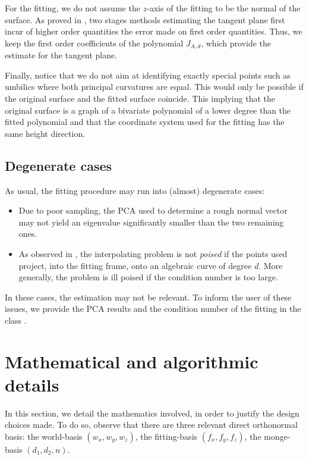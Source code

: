 For the fitting, we do not assume the $z$-axis of the fitting to be
the normal of the surface. 
As proved in \cite{cgal:cp-edqpf-05}, two stages methods estimating
the tangent plane first incur of higher order quantities the error
made on first order quantities.
Thus, we keep the first order coefficients of the polynomial
$J_{A,d}$, which provide the estimate for the tangent plane.

Finally, notice that we do not aim at identifying exactly special
points such as umbilics where both principal curvatures are
equal. This would only be possible if the original surface and the
fitted surface coincide. This implying that the original surface is a
graph of a bivariate polynomial of a lower degree than the fitted
polynomial and that the coordinate system used for the fitting has the
same height direction.


\subsection{Degenerate cases}
\label{sec:deg-cases}

As usual, the  fitting procedure may run into (almost) degenerate
cases:
\begin{itemize}
\item
Due to poor sampling, the PCA used to determine a rough normal vector
may not yield an eigenvalue significantly smaller than the two
remaining ones.

\item
As observed in \cite{cgal:cp-edqpf-05}, the interpolating problem is
not {\em poised} if the points used project, into the fitting frame,
onto an algebraic curve of degree $d$. More generally, the problem is
ill poised if the condition number is too large.
\end{itemize}
In these cases, the estimation may not be relevant. To inform the user
of these issues, we provide the PCA results and the condition number
of the fitting in the class .

\section{Mathematical and algorithmic details}

In this section, we detail the mathematics involved, in order to
justify the design choices made.
To do so, observe that there are three relevant direct orthonormal
basis: the world-basis $(w_x,w_y,w_z)$, the fitting-basis
$(f_x,f_y,f_z)$, the monge-basis $(d_1,d_2,n)$.

